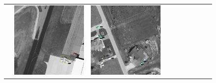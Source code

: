 \begin{figure}[h!]
\begin{tabularx}{\textwidth}{c|*{9}{X}}
    &  \includegraphics[trim={650pt 120pt 170pt 720pt},clip,width=\linewidth]{images/015Results/03ablation/comp_images/green/487.png}
    & \includegraphics[trim={230pt 200pt 680pt 725pt},clip,width=\linewidth]{images/015Results/03ablation/comp_images/green/509.png}

\end{tabularx}
\end{figure}
